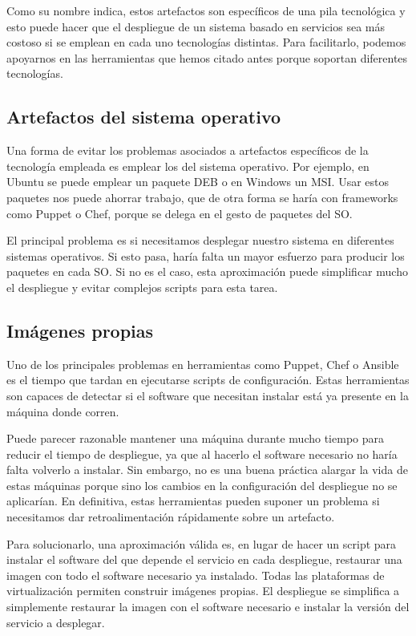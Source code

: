 \documentclass[11pt,a4paper]{article}
\begin{document}
Como su nombre indica, estos artefactos son específicos de una pila tecnológica y esto puede hacer que el despliegue de un sistema basado en servicios sea más costoso si se emplean en cada uno tecnologías distintas. Para facilitarlo, podemos apoyarnos en las herramientas que hemos citado antes porque soportan diferentes tecnologías.

\subsection{Artefactos del sistema operativo}

Una forma de evitar los problemas asociados a artefactos específicos de la tecnología empleada es emplear los del sistema operativo. Por ejemplo, en Ubuntu se puede emplear un paquete DEB o en Windows un MSI. Usar estos paquetes nos puede ahorrar trabajo, que de otra forma se haría con frameworks como Puppet o Chef, porque se delega en el gesto de paquetes del SO.

El principal problema es si necesitamos desplegar nuestro sistema en diferentes sistemas operativos. Si esto pasa, haría falta un mayor esfuerzo para producir los paquetes en cada SO. Si no es el caso, esta aproximación puede simplificar mucho el despliegue y evitar complejos scripts para esta tarea.

\subsection{Imágenes propias}

Uno de los principales problemas en herramientas como Puppet, Chef o Ansible es el tiempo que tardan en ejecutarse scripts de configuración. Estas herramientas son capaces de detectar si el software que necesitan instalar está ya presente en la máquina donde corren. 

Puede parecer razonable mantener una máquina durante mucho tiempo para reducir el tiempo de despliegue, ya que al hacerlo el software necesario no haría falta volverlo a instalar. Sin embargo, no es una buena práctica alargar la vida de estas máquinas porque sino los cambios en la configuración del despliegue no se aplicarían. En definitiva, estas herramientas pueden suponer un problema si necesitamos dar retroalimentación rápidamente sobre un artefacto.

Para solucionarlo, una aproximación válida es, en lugar de hacer un script para instalar el software del que depende el servicio en cada despliegue, restaurar una imagen con todo el software necesario ya instalado. Todas las plataformas de virtualización permiten construir imágenes propias. El despliegue se simplifica a simplemente restaurar la imagen con el software necesario e instalar la versión del servicio a desplegar.
\end{document}
